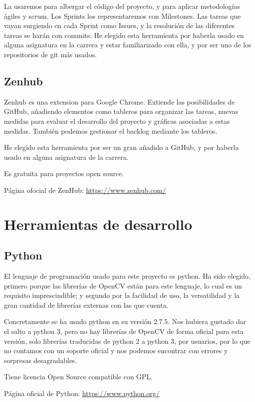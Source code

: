 La usaremos para albergar el código del proyecto, y para aplicar metodologías ágiles y scrum. Los Sprints los representaremos con Milestones. Las tareas que vayan surgiendo en cada Sprint como Issues, y la resolución de las diferentes tareas se harán con commits. He elegido esta herramienta por haberla usado en alguna asignatura en la carrera y estar familiarizado con ella, y por ser uno de los repositorios de git más usados.

\subsection{Zenhub}
Zenhub es una extension para Google Chrome. Extiende las posibilidades de GitHub, añadiendo elementos como tableros para organizar las tareas, nuevas medidas para evaluar el desarrollo del proyecto y gráficas asociadas a estas medidas. También podemos gestionar el backlog mediante los tableros.

He elegido esta herramienta por ser un gran añadido a GitHub, y por haberla usado en alguna asignatura de la carrera.  

Es gratuita para proyectos open source.

Página ofocial de ZenHub: \url{https://www.zenhub.com/}


\section{Herramientas de desarrollo}

\subsection{Python}
El lenguaje de programación usado para este proyecto es python. Ha sido elegido, primero porque las librerías de OpenCV están para este lenguaje, lo cual es un requisito imprescindible; y segundo por la facilidad de uso, la versatilidad y la gran cantidad de librerías externas con las que cuenta.

Concretamente se ha usado python en su versión 2.7.5.
Nos hubiera gustado dar el salto a python 3, pero no hay librerías de OpenCV de forma oficial para esta versión, solo librerías traducidas de python 2 a python 3, por usuarios, por lo que no contamos con un soporte oficial y nos podemos encontrar con errores y sorpresas desagradables.

Tiene licencia Open Source compatible con GPL.

Página oficial de Python: \url{https://www.python.org/}

